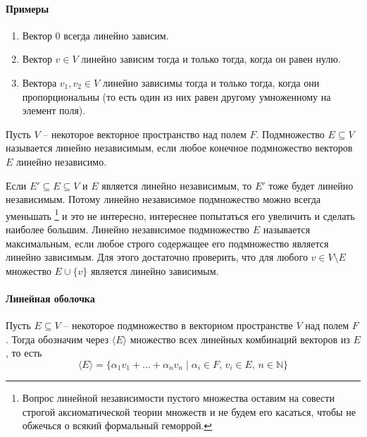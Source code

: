 \paragraph{Примеры}

\begin{enumerate}
\item Вектор $0$ всегда линейно зависим.

\item Вектор $v\in V$ линейно зависим тогда и только тогда, когда он равен нулю.

\item Вектора $v_1, v_2 \in V$ линейно зависимы тогда и только тогда, когда они пропорциональны (то есть один из них равен другому умноженному на элемент поля).
\end{enumerate}

\begin{definition}
\label{def::LinDepAny}
Пусть $V$ -- некоторое векторное пространство над полем $F$.
Подмножество $E\subseteq V$ называется линейно независимым, если любое конечное подмножество векторов $E$ линейно независимо.
\end{definition}

Если $E'\subseteq E\subseteq V$ и $E$ является линейно независимым, то $E'$ тоже будет линейно независимым.
Потому линейно независимое подмножество можно всегда уменьшать%
\footnote{Вопрос линейной независимости пустого множества оставим на совести строгой аксиоматической теории множеств и не будем его касаться, чтобы не обжечься о всякий формальный геморрой.}
и это не интересно, интереснее попытаться его увеличить и сделать наиболее большим.
Линейно независимое подмножество $E$ называется максимальным, если любое строго содержащее его подмножество является линейно зависимым.
Для этого достаточно проверить, что для любого $v\in V\setminus E$ множество $E\cup \{v\}$ является линейно зависимым.

\paragraph{Линейная оболочка}

\begin{definition}
\label{def::LinSpan}
Пусть $E\subseteq V$ -- некоторое подмножество в векторном пространстве $V$ над полем $F$.
Тогда обозначим через $\langle E \rangle$ множество всех линейных комбинаций векторов из $E$, то есть
\[
\langle E \rangle = \{\alpha_1 v_1 + \ldots + \alpha_n v_n \mid \alpha_i\in F,\, v_i \in E,\, n\in\mathbb N\}
\]
\end{definition}

